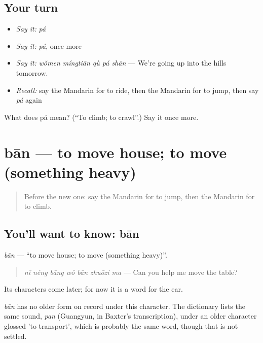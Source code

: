 \subsection*{Your turn}
\begin{itemize}
\raggedright
  \item \emph{Say it:} \emph{pá}
  \item \emph{Say it:} \emph{pá}, once more
  \item \emph{Say it:} \emph{wǒmen míngtiān qù pá shān} — We're going up into the hills tomorrow.
  \item \emph{Recall:} say the Mandarin for to ride, then the Mandarin for to jump, then say \emph{pá} again
\end{itemize}

\begin{tcolorbox}[breakable,colback=teal!4,colframe=teal!35!black,title={Before you move on}]
What does pá mean? (\textquotedblleft{}To climb; to crawl\textquotedblright{}.) Say it once more.
\end{tcolorbox}
\section[bān]{bān — to move house; to move (something heavy)}

\label{lesson:ZH-C107-ban}



\begin{quote}
Before the new one: say the Mandarin for to jump, then the Mandarin for to climb.
\end{quote}

\subsection*{You'll want to know: bān}
\emph{bān} — \textquotedblleft{}to move house; to move (something heavy)\textquotedblright{}.

\begin{quote}
\emph{nǐ néng bāng wǒ bān zhuōzi ma} — Can you help me move the table?
\end{quote}

Its characters come later; for now it is a word for the ear.

\begin{cousinweb}
\emph{bān} has no older form on record under this character. The dictionary lists the same sound, \emph{pan} (Guangyun, in Baxter's transcription), under an older character glossed 'to transport', which is probably the same word, though that is not settled.
\end{cousinweb}

